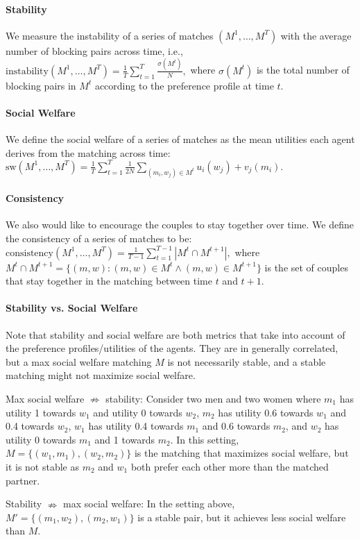 \paragraph{Stability} We measure the instability of a series of matches $(M^1, \ldots, M^T)$ with the average number of blocking pairs across time, i.e.,
$
    \mbox{instability}(M^1, \ldots, M^T) = \frac{1}{T}\sum_{t=1}^T{\frac{\sigma(M^t)}{N}},
$
where $\sigma(M^t)$ is the total number of blocking pairs in $M^t$ according to the preference profile at time $t$.
\paragraph{Social Welfare} We define the social welfare of a series of matches as the mean utilities each agent derives from the matching across time:
$
    \mbox{sw}(M^1, \ldots, M^T) = \frac{1}{T}\sum_{t=1}^T{\frac{1}{2N}{\sum_{(m_i, w_j)\in M^t}{u_i(w_j) + v_j(m_i)}}}.
$
\paragraph{Consistency} We also would like to encourage the couples to stay together over time. We define the consistency of a series of matches to be:
$
    \mbox{consistency}(M^1, \ldots, M^T) = \frac{1}{T-1}\sum_{t=1}^{T-1}{|M^t \cap M^{t+1}|},
$
where $M^t \cap M^{t+1} = \{(m, w): (m, w) \in M^t \wedge (m, w) \in M^{t+1}\}$ is the set of couples that stay together in the matching between time $t$ and $t+1$.

\paragraph{Stability vs. Social Welfare} Note that stability and social welfare are both metrics that take into account of the preference profiles/utilities of the agents. They are in generally correlated, but a max social welfare matching $M$ is not necessarily stable, and a stable matching might not maximize social welfare.

Max social welfare $\nRightarrow$ stability: Consider two men and two women where $m_1$ has utility 1 towards $w_1$ and utility 0 towards $w_2$, $m_2$ has utility 0.6 towards $w_1$ and 0.4 towards $w_2$, $w_1$ has utility 0.4 towards $m_1$ and 0.6 towards $m_2$, and $w_2$ has utility 0 towards $m_1$ and 1 towards $m_2$. In this setting, $M = \{(w_1, m_1), (w_2, m_2)\}$ is the matching that maximizes social welfare, but it is not stable as $m_2$ and $w_1$ both prefer each other more than the matched partner.

Stability $\nRightarrow$ max social welfare: In the setting above, $M' = \{(m_1, w_2), (m_2, w_1)\}$ is a stable pair, but it achieves less social welfare than $M$.